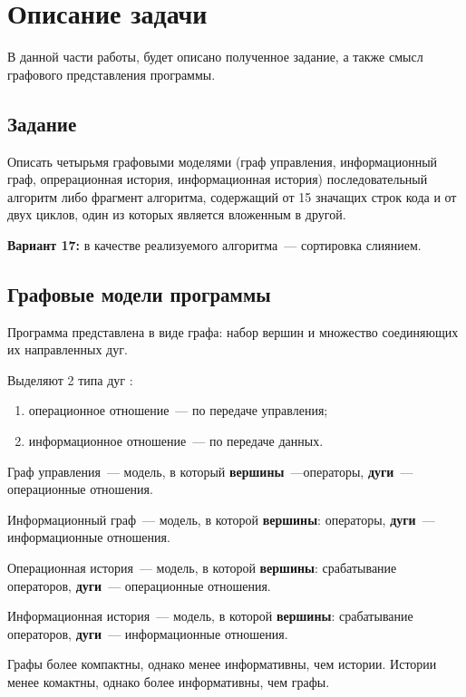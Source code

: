 \chapter{Описание задачи}
В данной части работы, будет описано полученное задание, а также смысл графового представления программы.

\section{Задание}

Описать четырьмя графовыми моделями (граф управления, информационный граф, опрерационная история, информационная история) последовательный алгоритм либо фрагмент алгоритма, содержащий от 15 значащих строк кода и от двух циклов, один из которых является вложенным в другой.

\textbf{Вариант 17:} в качестве реализуемого алгоритма~--- сортировка слиянием.

\section{Графовые модели программы}

Программа представлена в виде графа: набор вершин и множество соединяющих их направленных дуг.


Выделяют 2 типа дуг \cite{graph}:
\begin{enumerate}
    \item операционное отношение~--- по передаче управления;
    \item информационное отношение~--- по передаче данных.
\end{enumerate}

Граф управления~--- модель, в который \textbf{вершины}~---операторы, \textbf{дуги}~--- операционные отношения.

Информационный граф~--- модель, в которой \textbf{вершины}: операторы, \textbf{дуги}~--- информационные отношения.

Операционная история~--- модель, в которой \textbf{вершины}: срабатывание операторов, \textbf{дуги}~--- операционные отношения.

Информационная история~--- модель, в которой \textbf{вершины}: срабатывание операторов, \textbf{дуги}~--- информационные отношения.

Графы более компактны, однако менее информативны, чем истории. Истории менее комактны, однако более информативны, чем графы.
